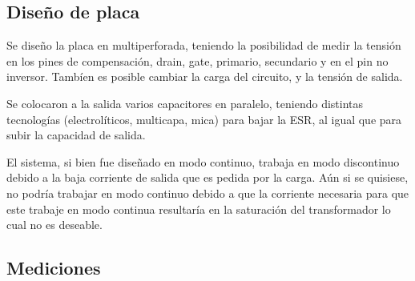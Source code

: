 %
%
%

\subsection{Diseño de placa}
Se diseño la placa en multiperforada, teniendo la posibilidad de medir la tensión en los pines de compensación, drain, gate, primario, secundario y en el pin no inversor. Tambíen es posible cambiar la carga del circuito, y la tensión de salida.

Se colocaron a la salida varios capacitores en paralelo, teniendo distintas tecnologías (electrolíticos, multicapa, mica) para bajar la ESR, al igual que para subir la capacidad de salida. 

El sistema, si bien fue diseñado en modo continuo, trabaja en modo discontinuo debido a la baja corriente de salida que es pedida por la carga. Aún si se quisiese, no podría trabajar en modo continuo debido a que la corriente necesaria para que este trabaje en modo continua resultaría en la saturación del transformador lo cual no es deseable.

\subsection{Mediciones}

%